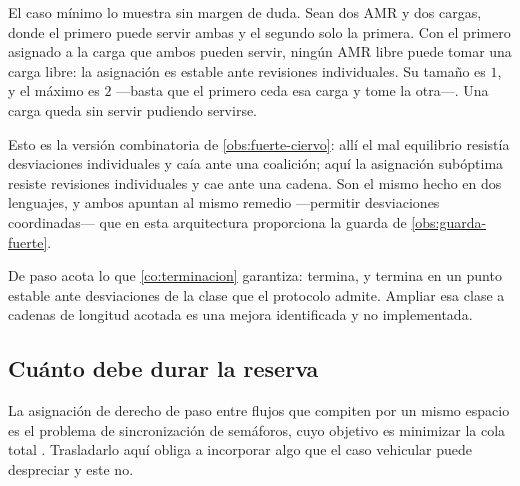 \begin{observacion}
\label{obs:berge}
El caso mínimo lo muestra sin margen de duda. Sean dos AMR y dos cargas, donde
el primero puede servir ambas y el segundo solo la primera. Con el primero
asignado a la carga que ambos pueden servir, ningún AMR libre puede tomar una
carga libre: la asignación es estable ante revisiones individuales. Su tamaño es
$1$, y el máximo es $2$ —basta que el primero ceda esa carga y tome la otra—.
Una carga queda sin servir pudiendo servirse.

Esto es la versión combinatoria de \cref{obs:fuerte-ciervo}: allí el mal
equilibrio resistía desviaciones individuales y caía ante una coalición; aquí la
asignación subóptima resiste revisiones individuales y cae ante una cadena. Son
el mismo hecho en dos lenguajes, y ambos apuntan al mismo remedio —permitir
desviaciones coordinadas— que en esta arquitectura proporciona la guarda de
\cref{obs:guarda-fuerte}.

De paso acota lo que \cref{co:terminacion} garantiza: termina, y termina en un
punto estable ante desviaciones de la clase que el protocolo admite. Ampliar esa
clase a cadenas de longitud acotada es una mejora identificada y no implementada.
\end{observacion}

\subsection{Cuánto debe durar la reserva}

La asignación de derecho de paso entre flujos que compiten por un mismo espacio
es el problema de sincronización de semáforos, cuyo objetivo es minimizar la cola
total \cite{clempner2024optimization}. Trasladarlo aquí obliga a incorporar algo
que el caso vehicular puede despreciar y este no.


